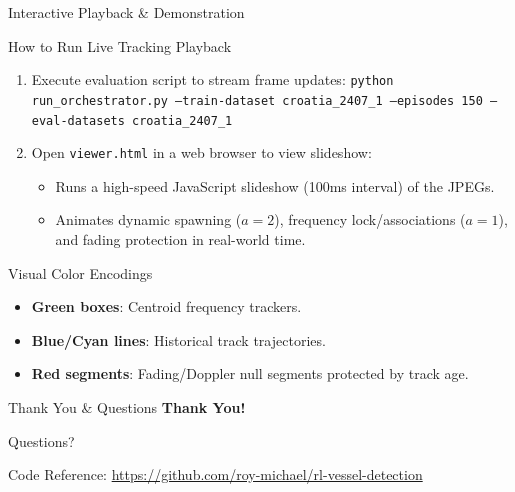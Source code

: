 \documentclass[10pt]{beamer}
\begin{document}
\begin{frame}{Interactive Playback \& Demonstration}
    \begin{block}{How to Run Live Tracking Playback}
        \begin{enumerate}
            \item Execute evaluation script to stream frame updates:
                \texttt{python run\_orchestrator.py --train-dataset croatia\_2407\_1 --episodes 150 --eval-datasets croatia\_2407\_1}
            \item Open \texttt{viewer.html} in a web browser to view slideshow:
                \begin{itemize}
                    \item Runs a high-speed JavaScript slideshow (100ms interval) of the JPEGs.
                    \item Animates dynamic spawning ($a=2$), frequency lock/associations ($a=1$), and fading protection in real-world time.
                \end{itemize}
        \end{enumerate}
    \end{block}
    \begin{block}{Visual Color Encodings}
        \begin{itemize}
            \item \textbf{Green boxes}: Centroid frequency trackers.
            \item \textbf{Blue/Cyan lines}: Historical track trajectories.
            \item \textbf{Red segments}: Fading/Doppler null segments protected by track age.
        \end{itemize}
    \end{block}
\end{frame}

\begin{frame}{Thank You \& Questions}
    \centering
    \Huge \textbf{Thank You!}
    
    \vspace{1.5em}
    \Large \color{blue} Questions?
    
    \vspace{2.5em}
    \normalsize \color{gray} Code Reference: \url{https://github.com/roy-michael/rl-vessel-detection}
\end{frame}
\end{document}
